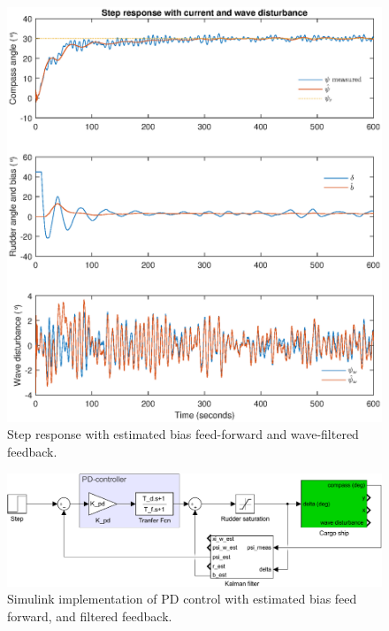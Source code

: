 \begin{figure}
    \centering
    \includegraphics[width=\textwidth]{images/oppg5/5e.eps}
    \caption{Step response with estimated bias feed-forward and wave-filtered feedback.}
    \label{fig:5e}
\end{figure}

\begin{figure}
    \centering
    \includegraphics[width=\textwidth]{images/oppg5/bias_FF_and_filtered_FB.pdf}
    \caption{Simulink implementation of PD control with estimated bias feed forward, and filtered feedback.}
    \label{fig:filtered_fb}
\end{figure}
